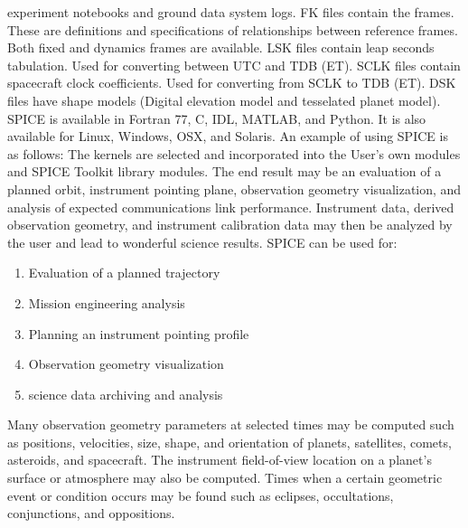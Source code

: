 \documentclass[crop=false,class=article,oneside]{standalone}
\begin{document}
            experiment notebooks and ground data system logs.
            FK files contain the frames. These are definitions
            and specifications of relationships between
            reference frames. Both fixed and dynamics frames
            are available. LSK files contain leap seconds
            tabulation. Used for converting between UTC and
            TDB (ET). SCLK files contain spacecraft clock
            coefficients. Used for converting from SCLK to
            TDB (ET). DSK files have shape models
            (Digital elevation model and tesselated
            planet model). SPICE is available in Fortran 77,
            C, IDL, MATLAB, and Python. It is also available
            for Linux, Windows, OSX, and Solaris. An example
            of using SPICE is as follows: The kernels are
            selected and incorporated into the User's own
            modules and SPICE Toolkit library modules. The
            end result may be an evaluation of a planned orbit,
            instrument pointing plane, observation geometry
            visualization, and analysis of expected
            communications link performance. Instrument data,
            derived observation geometry, and instrument
            calibration data may then be analyzed by the user
            and lead to wonderful science results. SPICE can
            be used for:
            \begin{enumerate}
                \item Evaluation of a planned trajectory
                \item Mission engineering analysis
                \item Planning an instrument pointing profile
                \item Observation geometry visualization
                \item science data archiving and analysis
            \end{enumerate}
            Many observation geometry parameters at selected
            times may be computed such as positions, velocities,
            size, shape, and orientation of planets, satellites,
            comets, asteroids, and spacecraft. The instrument
            field-of-view location on a planet's surface or
            atmosphere may also be computed. Times when a
            certain geometric event or condition occurs may
            be found such as eclipses, occultations,
            conjunctions, and oppositions.
\end{document}
